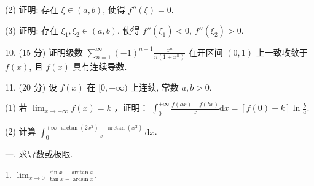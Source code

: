 \documentclass{examcollection}
\begin{document}
{\begin{minipage}{\textwidth}
(2) 证明: 存在 $\xi \in (a, b)$, 使得 $f''(\xi) = 0$.\par
(3) 证明: 存在 $\xi_1, \xi_2 \in (a, b)$, 使得 $f''(\xi_1) < 0$, $f''(\xi_2) > 0$.\par
10. (15 分) 证明级数 $\sum_{n=1}^{\infty} (-1)^{n-1} \frac{x^n}{n(1 + x^n)}$ 在开区间 $(0,1)$ 上一致收敛于 $f(x)$, 且 $f(x)$ 具有连续导数.\par
11. (20 分) 设 $f(x)$ 在 $[0, +\infty)$ 上连续, 常数 $a, b > 0$.\par
(1) 若 $\lim_{x\to +\infty}f(x) = k$ ，证明： $\int_0^{+\infty}\frac{f(ax) - f(bx)}{x}\mathrm{d}x = [f(0) - k]\ln \frac{b}{a}.$\par
(2) 计算 $\int_0^{+\infty} \frac{\arctan(2x^2) - \arctan(x^2)}{x} \, \mathrm{d}x$.\par
{}\smallskip
一. 求导数或极限.\par
1. $\lim_{x\to 0}\frac{\sin x - \arctan x}{\tan x - \arcsin x}.$\par
\end{minipage}}
\ifdim\dimexpr\ht\proofbox+\dp\proofbox\relax>\textheight
\noindent\resizebox{!}{\textheight}{\usebox{\proofbox}}\else\noindent\usebox{\proofbox}\fi\clearpage
\end{document}
